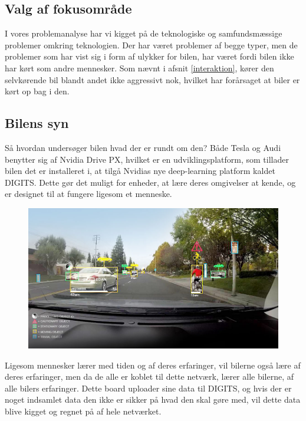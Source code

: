 \label{afgraensning}
\subsection{Valg af fokusområde}
I vores problemanalyse har vi kigget på de teknologiske og samfundsmæssige problemer omkring teknologien. Der har været problemer af begge typer, men de problemer som har vist sig i form af ulykker for bilen, har været fordi bilen ikke har kørt som andre mennesker. Som nævnt i afsnit \ref{interaktion}, kører den selvkørende bil blandt andet ikke aggressivt nok, hvilket har forårsaget at biler er kørt op bag i den.

\subsection{Bilens syn}
Så hvordan undersøger bilen hvad der er rundt om den? Både Tesla og Audi benytter sig af Nvidia Drive PX, hvilket er en udviklingsplatform, som tillader bilen det er installeret i, at tilgå Nvidias nye deep-learning platform kaldet DIGITS. Dette gør det muligt for enheder, at lære deres omgivelser at kende, og er designet til at fungere ligesom et menneske. 

\begin{figure}[h!]
	\centering
	\includegraphics[width=\textwidth]{images/nvidiadrive.png}
	\label{fig:DRIVE}
\end{figure}
Ligesom mennesker lærer med tiden og af deres erfaringer, vil bilerne også lære af deres erfaringer, men da de alle er koblet til dette netværk, lærer alle bilerne, af alle bilers erfaringer\cite{Nvidia}. Dette board uploader sine data til DIGITS, og hvis der er noget indsamlet data den ikke er sikker på hvad den skal gøre med, vil dette data blive kigget og regnet på af hele netværket.

